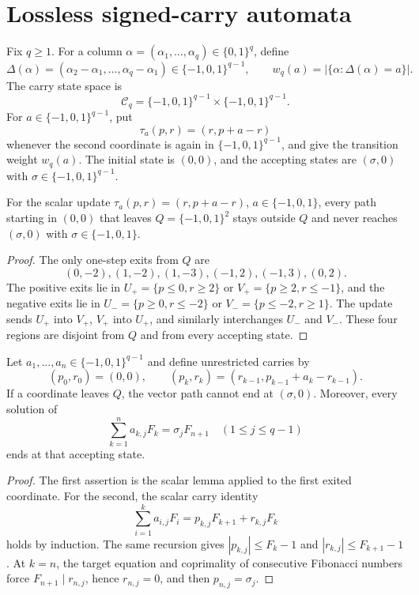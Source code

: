 \section{Lossless signed-carry automata}
\label{sec:carry-automata}

Fix \(q\ge1\).  For a column
\(\alpha=(\alpha_1,\ldots,\alpha_q)\in\{0,1\}^q\), define
\[
 \Delta(\alpha)=(\alpha_2-\alpha_1,\ldots,\alpha_q-\alpha_1)
 \in\{-1,0,1\}^{q-1},
 \qquad
 w_q(a)=|\{\alpha:\Delta(\alpha)=a\}|.
\]
The carry state space is
\[
 \mathcal C_q=\{-1,0,1\}^{q-1}\times\{-1,0,1\}^{q-1}.
\]
For \(a\in\{-1,0,1\}^{q-1}\), put
\[
 \tau_a(p,r)=(r,p+a-r)
\]
whenever the second coordinate is again in \(\{-1,0,1\}^{q-1}\), and give the
transition weight \(w_q(a)\).  The initial state is \((0,0)\), and the
accepting states are \((\sigma,0)\) with
\(\sigma\in\{-1,0,1\}^{q-1}\).

\begin{lemma}
\label{lem:scalar-signed-fibonacci-exit-classification}
For the scalar update \(\tau_a(p,r)=(r,p+a-r)\), \(a\in\{-1,0,1\}\), every
path starting in \((0,0)\) that leaves \(Q=\{-1,0,1\}^2\) stays outside \(Q\)
and never reaches \((\sigma,0)\) with \(\sigma\in\{-1,0,1\}\).
\end{lemma}
\begin{proof}
The only one-step exits from \(Q\) are
\[
 (0,-2),(1,-2),(1,-3),(-1,2),(-1,3),(0,2).
\]
The positive exits lie in
\(U_+=\{p\le0,r\ge2\}\) or \(V_+=\{p\ge2,r\le-1\}\), and the negative
exits lie in
\(U_-=\{p\ge0,r\le-2\}\) or \(V_-=\{p\le-2,r\ge1\}\).
The update sends \(U_+\) into \(V_+\), \(V_+\) into \(U_+\), and similarly
interchanges \(U_-\) and \(V_-\).  These four regions are disjoint from \(Q\)
and from every accepting state.
\end{proof}

\begin{lemma}
\label{lem:coordinatewise-signed-fibonacci-exit-deletion}
Let \(a_1,\ldots,a_n\in\{-1,0,1\}^{q-1}\) and define unrestricted carries by
\[
 (p_0,r_0)=(0,0),\qquad
 (p_k,r_k)=(r_{k-1},p_{k-1}+a_k-r_{k-1}).
\]
If a coordinate leaves \(Q\), the vector path cannot end at \((\sigma,0)\).
Moreover, every solution of
\[
 \sum_{k=1}^n a_{k,j}F_k=\sigma_jF_{n+1}
 \quad(1\le j\le q-1)
\]
ends at that accepting state.
\end{lemma}
\begin{proof}
The first assertion is the scalar lemma applied to the first exited
coordinate.  For the second, the scalar carry identity
\[
 \sum_{i=1}^k a_{i,j}F_i=p_{k,j}F_{k+1}+r_{k,j}F_k
\]
holds by induction.  The same recursion gives
\(|p_{k,j}|\le F_k-1\) and \(|r_{k,j}|\le F_{k+1}-1\).  At \(k=n\), the target
equation and coprimality of consecutive Fibonacci numbers force
\(F_{n+1}\mid r_{n,j}\), hence \(r_{n,j}=0\), and then \(p_{n,j}=\sigma_j\).
\end{proof}

